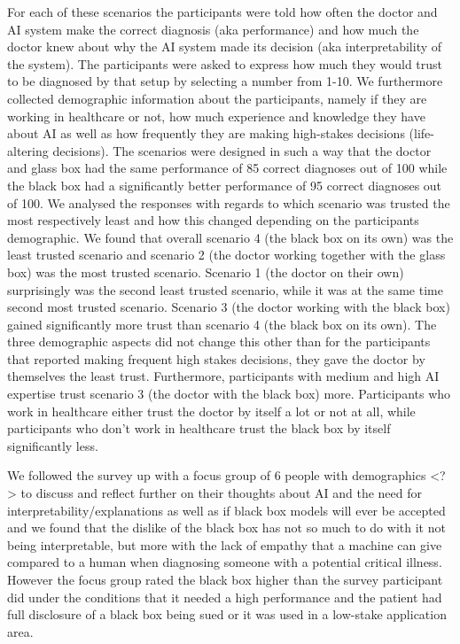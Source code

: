 \documentclass[manuscript,screen,review]{acmart}
\begin{document}
For each of these scenarios the participants were told how often the doctor and AI system make the correct diagnosis (aka performance) and how much the doctor knew about why the AI system made its decision (aka interpretability of the system). The participants were asked to express how much they would trust to be diagnosed by that setup by selecting a number from 1-10. We furthermore collected demographic information about the participants, namely if they are working in healthcare or not, how much experience and knowledge they have about AI as well as how frequently they are making high-stakes decisions (life-altering decisions). The scenarios were designed in such a way that the doctor and glass box had the same performance of 85 correct diagnoses out of 100 while the black box had a significantly better performance of 95 correct diagnoses out of 100. We analysed the responses with regards to which scenario was trusted the most respectively least and how this changed depending on the participants demographic. We found that overall scenario 4 (the black box on its own) was the least trusted scenario and scenario 2 (the doctor working together with the glass box) was the most trusted scenario. Scenario 1 (the doctor on their own) surprisingly was the second least trusted scenario, while it was at the same time second most trusted scenario. Scenario 3 (the doctor working with the black box) gained significantly more trust than scenario 4 (the black box on its own). The three demographic aspects did not change this other than for the participants that reported making frequent high stakes decisions, they gave the doctor by themselves the least trust. Furthermore, participants with medium and high AI expertise trust scenario 3 (the doctor with the black box) more. Participants who work in healthcare either trust the doctor by itself a lot or not at all, while participants who don’t work in healthcare trust the black box by itself significantly less.

We followed the survey up with a focus group of 6 people with demographics <?> to discuss and reflect further on their thoughts about AI and the need for interpretability/explanations as well as if black box models will ever be accepted and we found that the dislike of the black box has not so much to do with it not being interpretable, but more with the lack of empathy that a machine can give compared to a human when diagnosing someone with a potential critical illness. However the focus group rated the black box higher than the survey participant did under the conditions that it needed a high performance and the patient had full disclosure of a black box being sued or it was used in a low-stake application area.
\end{document}
